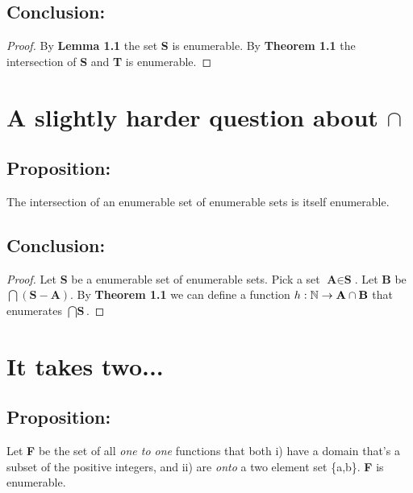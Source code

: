 \documentclass[a4paper,11pt]{article}
\begin{document}
	\subsection*{Conclusion:}
	\begin{proof}
	By \textbf{Lemma 1.1} the set \textbf{S} is enumerable.  By \textbf{Theorem 1.1} the intersection
	of \textbf{S} and \textbf{T} is enumerable.
	\end{proof}
		
\pagebreak


\section{A slightly harder question about $\cap$}

	\subsection*{Proposition:}
	The intersection of an enumerable set of enumerable sets is itself enumerable.

	\bigskip
	
	\subsection*{Conclusion:}
	\begin{proof}
	Let \textbf{S} be a enumerable set of enumerable sets. Pick a set $\textbf{A} \in \textbf{S}$. Let
	\textbf{B} be $\bigcap (\textbf{S} - \textbf{A})$. By \textbf{Theorem 1.1} we can define a function 
	$\mathnormal{h}: \mathbb{N} \rightarrow \textbf{A} \cap \textbf{B}$ that enumerates $\bigcap \textbf{S}$.	
	\end{proof}
	
\bigskip


\section{It takes two...}

	\subsection*{Proposition:}
	Let \textbf{F} be the set of all \textit{one to one} functions that both i) have a domain that's a subset of the positive
	integers, and ii) are \textit{onto} a two element set \{a,b\}. \textbf{F} is enumerable.
	
\end{document}
